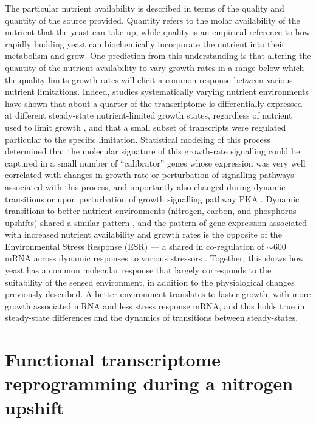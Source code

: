 The particular nutrient availability is described in terms of the 
quality and quantity of the source provided. Quantity refers to
the molar availability of the nutrient that the yeast can take up,
while quality is an empirical reference to how rapidly budding
yeast can biochemically incorporate the nutrient into their metabolism
and grow.
One prediction from this understanding is that
altering the quantity of the nutrient availability to vary growth
rates in a range below which the quality limits growth rates will
elicit a common response between various nutrient limitations.
Indeed, studies systematically varying nutrient environments have
shown that about a quarter of the transcriptome is differentially
expressed at different steady-state nutrient-limited growth states,
regardless of nutrient used to limit growth 
\parencite{brauer2008coordination,regenberg2006growth}, and that a
small subset of transcripts were regulated particular to the specific
limitation. 
Statistical modeling of this process
determined that the molecular signature of this growth-rate signalling
could be captured in a small number of “calibrator” genes whose
expression was very well correlated with changes in growth rate or
perturbation of signalling pathways associated with this process, and
importantly also changed during dynamic transitions or upon
perturbation of growth signalling pathway PKA 
\parencite{airoldi2009predicting}.
Dynamic transitions to better nutrient environments (nitrogen, carbon,
and phosphorus upshifts) shared a similar pattern 
\parencite{conway2012glucose}, 
and the pattern of gene expression associated with increased
nutrient availability and growth rates is the opposite of the
Environmental Stress Response (ESR) --- a shared in co-regulation of
$\sim$600 mRNA across dynamic responses to various stressors 
\parencite{gasch2000genomic}. 
Together, this shows how yeast has a common molecular response that
largely corresponds to the suitability of the sensed environment,
in addition to the physiological changes previously described.
A better environment translates to faster growth, with
more growth associated mRNA and less stress response mRNA, and this
holds true in steady-state differences and the dynamics of 
transitions between steady-states.


\section{Functional transcriptome reprogramming during a
nitrogen upshift}

